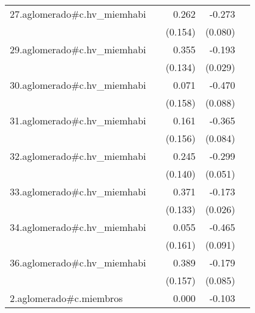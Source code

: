 {\begin{longtable}{l*{4}{D{.}{.}{-1}}}
\addlinespace
27.aglomerado#c.hv\_miemhabi&                     &       0.262         &      -0.273\sym{***}&                     \\
            &                     &     (0.154)         &     (0.080)         &                     \\
\addlinespace
29.aglomerado#c.hv\_miemhabi&                     &       0.355\sym{**} &      -0.193\sym{***}&                     \\
            &                     &     (0.134)         &     (0.029)         &                     \\
\addlinespace
30.aglomerado#c.hv\_miemhabi&                     &       0.071         &      -0.470\sym{***}&                     \\
            &                     &     (0.158)         &     (0.088)         &                     \\
\addlinespace
31.aglomerado#c.hv\_miemhabi&                     &       0.161         &      -0.365\sym{***}&                     \\
            &                     &     (0.156)         &     (0.084)         &                     \\
\addlinespace
32.aglomerado#c.hv\_miemhabi&                     &       0.245         &      -0.299\sym{***}&                     \\
            &                     &     (0.140)         &     (0.051)         &                     \\
\addlinespace
33.aglomerado#c.hv\_miemhabi&                     &       0.371\sym{**} &      -0.173\sym{***}&                     \\
            &                     &     (0.133)         &     (0.026)         &                     \\
\addlinespace
34.aglomerado#c.hv\_miemhabi&                     &       0.055         &      -0.465\sym{***}&                     \\
            &                     &     (0.161)         &     (0.091)         &                     \\
\addlinespace
36.aglomerado#c.hv\_miemhabi&                     &       0.389\sym{*}  &      -0.179\sym{*}  &                     \\
            &                     &     (0.157)         &     (0.085)         &                     \\
\addlinespace
2.aglomerado#c.miembros&                     &       0.000         &      -0.103\sym{***}&                     \\

\end{longtable}}
